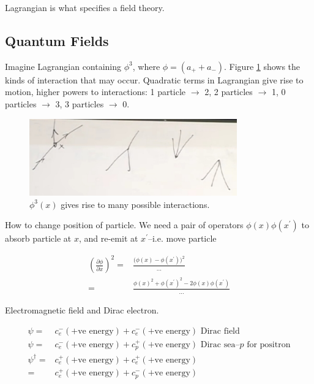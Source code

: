 \documentclass[]{article}
\begin{document}
Lagrangian is what specifies a field theory.

\subsection{Quantum Fields}

Imagine Lagrangian containing $\phi^3$, where $\phi = (a_+ + a_-)$.
Figure \ref{fig:phi:3:x} shows the kinds of interaction that may occur. Quadratic terms in Lagrangian give rise to motion, higher powers to interactions: 1 particle $\rightarrow$ 2, 2 particles $\rightarrow$ 1, 0 particles $\rightarrow$ 3, 3 particles $\rightarrow$ 0.
 
\begin{figure}[H]
	\caption{$\phi^3(x)$ gives rise to many possible interactions.}\label{fig:phi:3:x}
	\includegraphics[width=0.8\textwidth]{phi-3-x}
\end{figure}

How to change position of particle. We need a pair of operators $\phi(x) \phi(x^\prime)$ to absorb particle at $x$, and re-emit at $x^\prime$--i.e. move particle

\begin{align*}
(\frac{\partial \phi}{\partial x})^2 =& \frac{\big( \phi(x) - \phi(x^\prime)\big)^2}{...}\\
=& \frac{\phi(x)^2 + \phi(x^\prime)^2 - 2  \phi(x) \phi(x^\prime)}{...}
\end{align*}

Electromagnetic field and Dirac electron.

\begin{align*}
	\psi =& c_e^-(\text{+ve energy}) + c_e^-(\text{+ve energy}) \text{ Dirac field}\\
	\psi =& c_e^-(\text{+ve energy}) + c_p^+(\text{+ve energy}) \text { Dirac sea--$p$ for positron}\\
	\psi^\dagger =& c_e^+(\text{+ve energy}) + c_e^+(\text{+ve energy})\\
	=& c_e^+(\text{+ve energy}) + c_p^-(\text{+ve energy})
\end{align*}
\end{document}

